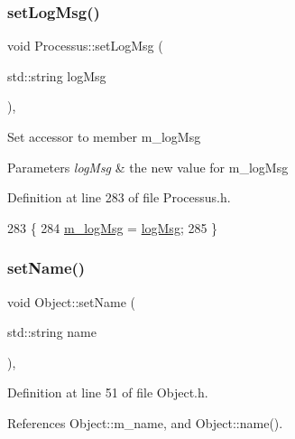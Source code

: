 \subsubsection{\texorpdfstring{set\+Log\+Msg()}{setLogMsg()}}
{\footnotesize\ttfamily void Processus\+::set\+Log\+Msg (\begin{DoxyParamCaption}\item[{std\+::string}]{log\+Msg }\end{DoxyParamCaption})\hspace{0.3cm}{\ttfamily [inline]}, {\ttfamily [inherited]}}

Set accessor to member m\+\_\+log\+Msg 
\begin{DoxyParams}{Parameters}
{\em log\+Msg} & the new value for m\+\_\+log\+Msg \\
\hline
\end{DoxyParams}


Definition at line 283 of file Processus.\+h.


\begin{DoxyCode}
283                                     \{
284     \hyperlink{classProcessus_a3bc0140a3a69a83951ab7f9986bd2c84}{m\_logMsg} = \hyperlink{classProcessus_a42fdeb17dc13ba854222666b6aa29b61}{logMsg};
285   \}
\end{DoxyCode}
\mbox{\label{classObject_ae30fea75683c2d149b6b6d17c09ecd0c}} 
\subsubsection{\texorpdfstring{set\+Name()}{setName()}}
{\footnotesize\ttfamily void Object\+::set\+Name (\begin{DoxyParamCaption}\item[{std\+::string}]{name }\end{DoxyParamCaption})\hspace{0.3cm}{\ttfamily [inline]}, {\ttfamily [inherited]}}



Definition at line 51 of file Object.\+h.



References Object\+::m\+\_\+name, and Object\+::name().



